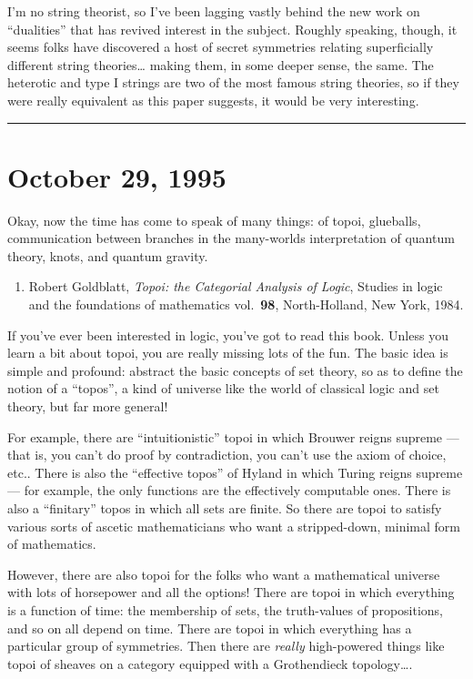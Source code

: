 \documentclass{article}
\def\tightlist{}
\begin{document}
I'm no string theorist, so I've been lagging vastly behind the new work
on ``dualities'' that has revived interest in the subject. Roughly
speaking, though, it seems folks have discovered a host of secret
symmetries relating superficially different string theories\ldots{}
making them, in some deeper sense, the same. The heterotic and type I
strings are two of the most famous string theories, so if they were
really equivalent as this paper suggests, it would be very interesting.

\begin{center}\rule{0.5\linewidth}{0.5pt}\end{center}
\hypertarget{week68}{%
\section{October 29, 1995}\label{week68}}

Okay, now the time has come to speak of many things: of topoi,
glueballs, communication between branches in the many-worlds
interpretation of quantum theory, knots, and quantum gravity.

\begin{enumerate}
\def\labelenumi{\arabic{enumi})}
\tightlist
\item
  Robert Goldblatt, \emph{Topoi: the Categorial Analysis of Logic},
  Studies in logic and the foundations of mathematics vol.~\textbf{98},
  North-Holland, New York, 1984.
\end{enumerate}

If you've ever been interested in logic, you've got to read this book.
Unless you learn a bit about topoi, you are really missing lots of the
fun. The basic idea is simple and profound: abstract the basic concepts
of set theory, so as to define the notion of a ``topos'', a kind of
universe like the world of classical logic and set theory, but far more
general!

For example, there are ``intuitionistic'' topoi in which Brouwer reigns
supreme --- that is, you can't do proof by contradiction, you can't use
the axiom of choice, etc.. There is also the ``effective topos'' of
Hyland in which Turing reigns supreme --- for example, the only
functions are the effectively computable ones. There is also a
``finitary'' topos in which all sets are finite. So there are topoi to
satisfy various sorts of ascetic mathematicians who want a
stripped-down, minimal form of mathematics.

However, there are also topoi for the folks who want a mathematical
universe with lots of horsepower and all the options! There are topoi in
which everything is a function of time: the membership of sets, the
truth-values of propositions, and so on all depend on time. There are
topoi in which everything has a particular group of symmetries. Then
there are \emph{really} high-powered things like topoi of sheaves on a
category equipped with a Grothendieck topology\ldots.
\end{document}
